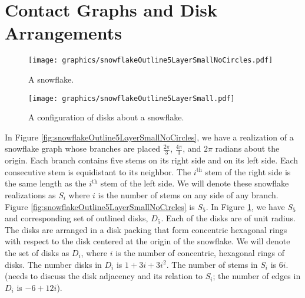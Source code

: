 

\section{Contact Graphs and Disk Arrangements}

\begin{figure}[!htbp]
\centering
\begin{minipage}{0.45\textwidth}
\centering
\texttt{[image: graphics/snowflakeOutline5LayerSmallNoCircles.pdf]}
\caption{A snowflake.}\label{fig:snowflakeOutline5LayerSmallNoCircles}
\end{minipage}\hfill
\begin{minipage}{0.45\textwidth}
\centering
\texttt{[image: graphics/snowflakeOutline5LayerSmall.pdf]}
\caption{A configuration of disks about a snowflake.}\label{fig:snowflakeOutline5Layer}
\end{minipage}
\end{figure}
In Figure \ref{fig:snowflakeOutline5LayerSmallNoCircles}, we have a realization of a snowflake graph whose branches are placed $\frac{2 \pi}{3}$, $\frac{4 \pi}{3}$, and $2 \pi$ radians about the origin. Each branch contains five stems on its right side and on its left side.  Each consecutive stem is equidistant to its neighbor.  The $i^\text{th}$ stem of the right side is the same length as the $i^\text{th}$ stem of the left side.  We will denote these snowflake realizations as $S_i$ where $i$ is the number of stems on any side of any branch.  Figure \ref{fig:snowflakeOutline5LayerSmallNoCircles} is $S_5$.  In Figure \ref{fig:snowflakeOutline5Layer}, we have $S_5$ and corresponding set of outlined disks, $D_5$.  Each of the disks are of unit radius.  The disks are arranged in a disk packing that form concentric hexagonal rings with respect to the disk centered at the origin of the snowflake.  We will denote the set of disks as $D_i$, where $i$ is the number of concentric, hexagonal rings of disks.  The number disks in $D_i$ is $1+3i+3i^2$.  The number of stems in $S_i$ is $6i$.  (needs to discuss the disk adjacency and its relation to $S_i$; the number of edges in $D_i$ is $-6 +12i$).

